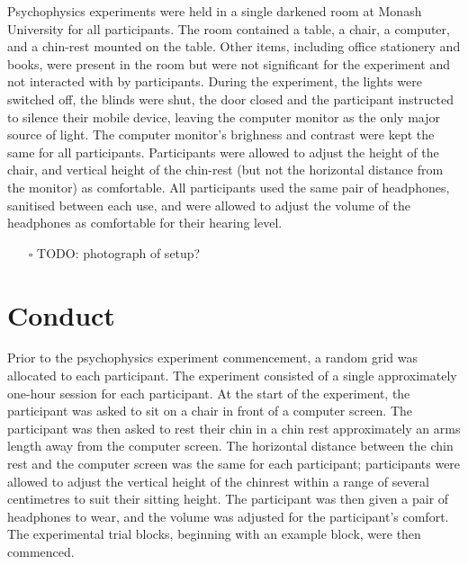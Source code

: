 \documentclass[a4paper,11pt,openany]{book}
\begin{document}
Psychophysics experiments were held in a single darkened room at Monash University for all participants.
The room contained a table, a chair, a computer, and a chin-rest mounted on the table.
Other items, including office stationery and books, were present in the room but were not significant for the experiment and not interacted with by participants.
During the experiment, the lights were switched off, the blinds were shut, the door closed and the participant instructed to silence their mobile device, leaving the computer monitor as the only major source of light.
The computer monitor's brighness and contrast were kept the same for all participants.
Participants were allowed to adjust the height of the chair, and vertical height of the chin-rest (but not the horizontal distance from the monitor) as comfortable.
All participants used the same pair of headphones, sanitised between each use, and were allowed to adjust the volume of the headphones as comfortable for their hearing level.

\begin{itemize}
\item[{$\square$}] TODO: photograph of setup?
\end{itemize}

\section*{Conduct}
\label{sec:orgf375e6d}

Prior to the psychophysics experiment commencement, a random grid was allocated to each participant.
The experiment consisted of a single approximately one-hour session for each participant.
At the start of the experiment, the participant was asked to sit on a chair in front of a computer screen.
The participant was then asked to rest their chin in a chin rest approximately an arms length away from the computer screen.
The horizontal distance between the chin rest and the computer screen was the same for each participant; participants were allowed to adjust the vertical height of the chinrest within a range of several centimetres to suit their sitting height.
The participant was then given a pair of headphones to wear, and the volume was adjusted for the participant's comfort.
The experimental trial blocks, beginning with an example block, were then commenced.
\end{document}
